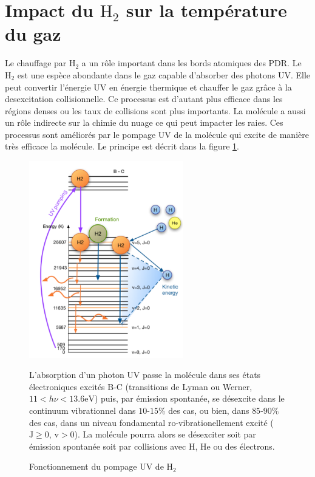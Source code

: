 \section{Impact du $\mathrm{H}_2$ sur la température du gaz}

Le chauffage par $\mathrm{H}_2$ a un rôle important dans les bords atomiques des PDR. Le $\mathrm{H}_2$ est une espèce abondante dans le gaz capable d'absorber des photons UV. Elle peut convertir l'énergie UV en énergie thermique et chauffer le gaz grâce à la desexcitation collisionnelle. Ce processus est d'autant plus efficace dans les régions denses ou les taux de collisions sont plus importants. La molécule a aussi un rôle indirecte sur la chimie du nuage ce qui peut impacter les raies. Ces processus sont améliorés par le pompage UV de la molécule qui excite de manière très efficace la molécule. Le principe est décrit dans la figure \ref{fig:H2pump}. \newline 


\begin{figure}[!h]
    \centering \includegraphics[trim = {0 0 0 0},clip,width=0.6\textwidth]{figure/h2.pdf}
    \caption{Fonctionnement du pompage UV de $\mathrm{H}_2$}
    \begin{minipage}{\textwidth}
L'absorption d'un photon UV passe la molécule dans ses états électroniques excités B-C (transitions de Lyman ou Werner, $ 11<h\nu<13.6\mathrm{eV}$) puis, par émission spontanée, se désexcite dans le continuum vibrationnel dans $10$-$15\%$ des cas, ou bien, dans $85$-$90\%$ des cas, dans un niveau fondamental ro-vibrationellement excité ($\mathrm{J}\geq0$, $\mathrm{v}>0$). La molécule pourra alors se désexciter soit par émission spontanée soit par collisions avec $\mathrm{H}$, $\mathrm{He}$ ou des électrons. 
    \end{minipage}
    \label{fig:H2pump}
\end{figure}



